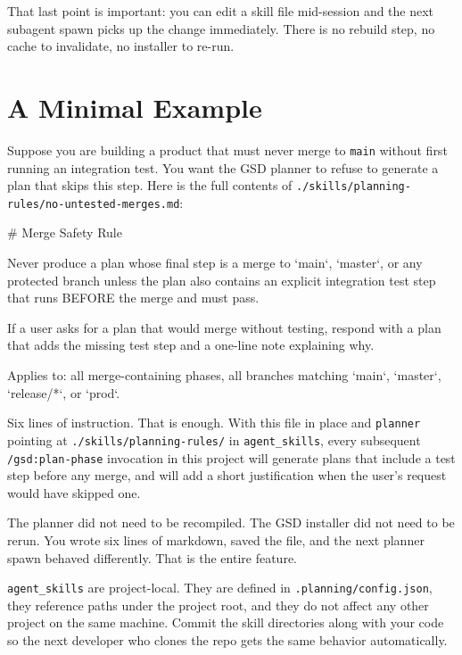 \documentclass[11pt,letterpaper,openany]{book}
\begin{document}
That last point is important: you can edit a skill file mid-session and
the next subagent spawn picks up the change immediately. There is no
rebuild step, no cache to invalidate, no installer to re-run.

\section{A Minimal Example}

Suppose you are building a product that must never merge to
\texttt{main} without first running an integration test. You want the
GSD planner to refuse to generate a plan that skips this step. Here is
the full contents of \texttt{./skills/planning-rules/no-untested-merges.md}:

\begin{gsdplain}
# Merge Safety Rule

Never produce a plan whose final step is a merge to `main`, `master`,
or any protected branch unless the plan also contains an explicit
integration test step that runs BEFORE the merge and must pass.

If a user asks for a plan that would merge without testing, respond
with a plan that adds the missing test step and a one-line note
explaining why.

Applies to: all merge-containing phases, all branches matching
`main`, `master`, `release/*`, or `prod`.
\end{gsdplain}

Six lines of instruction. That is enough. With this file in place and
\texttt{planner} pointing at \texttt{./skills/planning-rules/} in
\texttt{agent\_skills}, every subsequent \texttt{/gsd:plan-phase}
invocation in this project will generate plans that include a test
step before any merge, and will add a short justification when the
user's request would have skipped one.

The planner did not need to be recompiled. The GSD installer did not
need to be rerun. You wrote six lines of markdown, saved the file, and
the next planner spawn behaved differently. That is the entire feature.

\begin{gsdnote}
\texttt{agent\_skills} are project-local. They are defined in
\texttt{.planning/config.json}, they reference paths under the project
root, and they do not affect any other project on the same machine.
Commit the skill directories along with your code so the next developer
who clones the repo gets the same behavior automatically.
\end{gsdnote}
\end{document}
